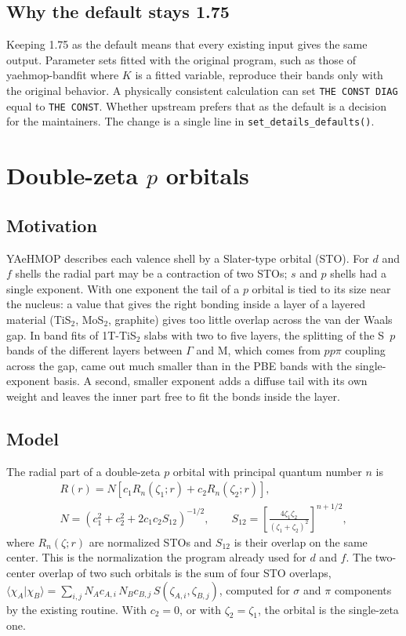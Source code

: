\documentclass[11pt,a4paper]{article}
\newcommand{\fn}[1]{\texttt{#1()}}
\begin{document}
\subsection{Why the default stays 1.75}

Keeping 1.75 as the default means that every existing input gives the same output. Parameter sets
fitted with the original program, such as those of yaehmop-bandfit where $K$ is a fitted
variable, reproduce their bands only with the original behavior. A physically consistent
calculation can set \texttt{THE CONST DIAG} equal to \texttt{THE CONST}. Whether upstream
prefers that as the default is a decision for the maintainers. The change is a single
line in \fn{set\_details\_defaults}.

\section{Double-zeta $p$ orbitals}\label{sec:pdz}

\subsection{Motivation}
YAeHMOP describes each valence shell by a Slater-type orbital (STO). For $d$ and $f$
shells the radial part may be a contraction of two STOs; $s$ and $p$ shells had a single
exponent. With one exponent the tail of a $p$ orbital is tied to its size near the
nucleus: a value that gives the right bonding inside a layer of a layered material
(TiS$_2$, MoS$_2$, graphite) gives too little overlap across the van der Waals gap. In
band fits of 1T-TiS$_2$ slabs with two to five layers, the splitting of the S~$p$ bands of
the different layers between $\Gamma$ and M, which comes from $pp\pi$ coupling across the
gap, came out much smaller than in the PBE bands with the single-exponent basis.
A second, smaller exponent adds a diffuse tail with its own weight and leaves the inner
part free to fit the bonds inside the layer.

\subsection{Model}
The radial part of a double-zeta $p$ orbital with principal quantum number $n$ is
\begin{gather}
R(r) = N\left[c_1 R_{n}(\zeta_1;r) + c_2 R_{n}(\zeta_2;r)\right],\\
N = \left(c_1^2 + c_2^2 + 2c_1c_2S_{12}\right)^{-1/2},\qquad
S_{12} = \left[\frac{4\zeta_1\zeta_2}{(\zeta_1+\zeta_2)^2}\right]^{n+1/2},
\end{gather}
where $R_n(\zeta;r)$ are normalized STOs and $S_{12}$ is their overlap on the same center.
This is the normalization the program already used for $d$ and $f$. The two-center overlap
of two such orbitals is the sum of four STO overlaps,
$\langle\chi_A|\chi_B\rangle=\sum_{i,j}N_Ac_{A,i}\,N_Bc_{B,j}\,S(\zeta_{A,i},\zeta_{B,j})$,
computed for $\sigma$ and $\pi$ components by the existing routine. With $c_2=0$, or with
$\zeta_2=\zeta_1$, the orbital is the single-zeta one.
\end{document}
